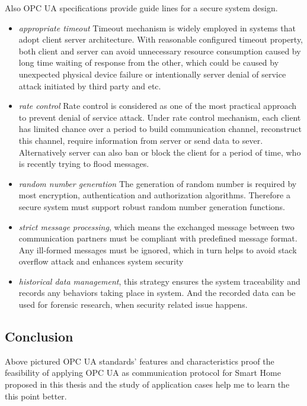Also OPC UA specifications provide guide lines for a secure system design\cite{O4}.
\begin{itemize}
\item \emph{appropriate timeout} Timeout mechanism is widely employed in systems that adopt client server architecture. With reasonable configured timeout property, both client and server can avoid unnecessary resource consumption caused by long time waiting of response from the other, which could be caused by unexpected physical device failure or intentionally server denial of service attack initiated by third party and etc. 
\item \emph{rate control} Rate control is considered as one of the most practical approach to prevent denial of service attack. Under rate control mechanism, each client has limited chance over a period to build communication channel, reconstruct this channel, require information from server or send data to sever. Alternatively server can also ban or block the client for a period of time, who is recently trying to flood messages. 
\item \emph{random number generation} The generation of random number is required by most encryption, authentication and authorization algorithms. Therefore a secure system must support robust random number generation functions.
\item \emph{strict message processing}, which means the exchanged message between two communication partners must be compliant with predefined message format. Any ill-formed messages must be ignored, which in turn helps to avoid stack overflow attack and enhances system security
\item \emph{historical data management}, this strategy ensures the system traceability and records any behaviors taking place in system. And the recorded data can be used for forensic research, when security related issue happens.
\end{itemize}
\subsection{Conclusion}
Above pictured OPC UA standards' features and characteristics proof the feasibility of applying OPC UA as communication protocol for Smart Home proposed in this thesis and the study of application cases help me to learn the this point better.

